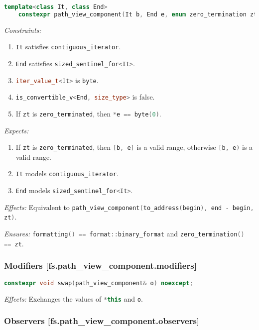\documentclass[11pt]{article}
\newcommand{\code}[2][cpp]{\lstinline[language=#1,basicstyle=\small\ttfamily]{#2}}
\newcommand{\desc}[1]{\textit{#1}}
\newcommand{\constraints}{\desc{Constraints: }}
\newcommand{\effects}{\desc{Effects: }}
\newcommand{\expects}{\desc{Expects: }}
\newcommand{\ensures}{\desc{Ensures: }}
\begin{document}
\begin{lstlisting}[language=cpp]
    template<class It, class End>
    constexpr path_view_component(It b, End e, enum zero_termination zt) noexcept;
\end{lstlisting}
\constraints \begin{enumerate}
    \item \code{It} satisfies \code{contiguous_iterator}.
    \item \code{End} satisfies \code{sized_sentinel_for<It>}.
    \item \code{iter_value_t<It>} is \code{byte}.
    \item \code{is_convertible_v<End, size_type>} is false.
    \item If \code{zt} is \code{zero_terminated}, then \code{*e == byte(0)}.
\end{enumerate}
\expects \begin{enumerate}
    \item If \code{zt} is \code{zero_terminated}, then \code{[b, e]} is a valid range, otherwise \code{[b, e)} is a valid range.
    \item \code{It} models \code{contiguous_iterator}.
    \item \code{End} models \code{sized_sentinel_for<It>}.
\end{enumerate}

\effects Equivalent to \code{path_view_component(to_address(begin), end - begin, zt)}.

\ensures \code{formatting() == format::binary_format} and \code{zero_termination() == zt}.\\

\subsubsection*{Modifiers [fs.path\_view\_component.modifiers]}

\begin{lstlisting}[language=cpp]
    constexpr void swap(path_view_component& o) noexcept;
\end{lstlisting}

\effects Exchanges the values of \code{*this} and \code{o}.\\

\subsubsection*{Observers [fs.path\_view\_component.observers]}
\end{document}
